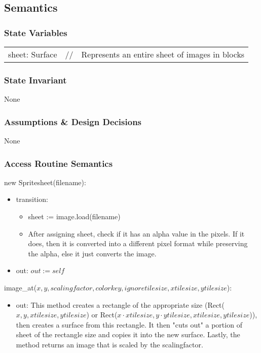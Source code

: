 \documentclass[12pt]{article}
\begin{document}
\subsection* {Semantics}

\subsubsection* {State Variables}

\begin{tabular}{lll}
    sheet: Surface & // & Represents an entire sheet of images in blocks\\ 
\end{tabular}
\subsubsection* {State Invariant}
None

\subsubsection* {Assumptions \& Design Decisions}
None

\subsubsection* {Access Routine Semantics}

new Spritesheet(filename):
\begin{itemize}
\item transition:
    \begin{itemize}[]
        \item sheet := image.load(filename)
        \item After assigning sheet, check if it has an alpha value in the pixels. If it does, then it is converted into a different pixel format while preserving the alpha, else it just converts the image.
    \end{itemize}
\item out: $out := self$
\end{itemize}

\noindent image\_at($x, y, scalingfactor, colorkey, ignoretilesize, xtilesize, ytilesize$):
\begin{itemize}
\item out: This method creates a rectangle of the appropriate size (Rect($x, y, xtilesize, ytilesize$) or Rect($x \cdot xtilesize, y \cdot ytilesize, xtilesize, ytilesize$)), then creates a surface from this rectangle. It then "cuts out" a portion of sheet of the rectangle size and copies it into the new surface. Lastly, the method returns an image that is scaled by the scalingfactor.
\end{itemize}
\end{document}
